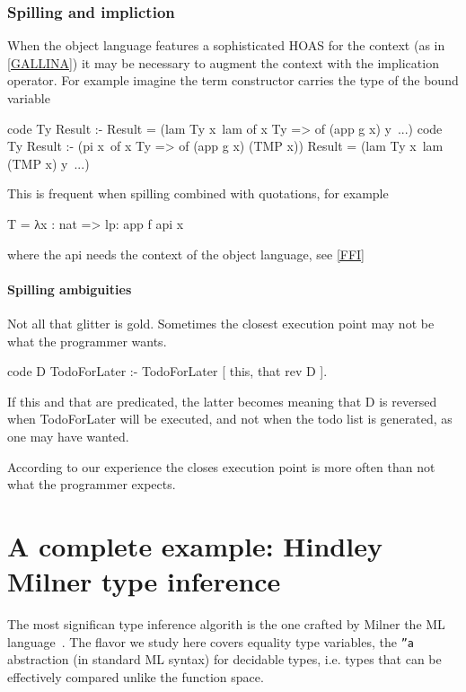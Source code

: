 \documentclass[a4paper, 11pt]{book}
\begin{document}
\subsubsection{Spilling and impliction}

When the object language features a sophisticated HOAS for the context
(as in \ref{GALLINA}) it may be necessary to augment the context with
the implication operator. For example imagine the 
term constructor carries the type of the bound variable

\begin{elpicode}
  code Ty Result :- Result = (lam Ty x\ lam {of x Ty => of (app g x)} y\ ...)
  code Ty Result :-
    (pi x\ of x Ty => of (app g x) (TMP x))
    Result = (lam Ty x\ lam (TMP x) y\ ...)
\end{elpicode}

This is frequent when spilling combined with quotations, for example

\begin{elpicode}
  T = {{ λx : nat => lp:{{ app f {api x}  }}  }}
\end{elpicode}

where the api needs the context of the object language, see \ref{FFI}

\paragraph{Spilling ambiguities}

Not all that glitter is gold. Sometimes the closest execution
point may not be what the programmer wants.

\begin{elpicode}
  code D TodoForLater  :-
    TodoForLater [ this, that {rev D} ].
\end{elpicode}

If this and that are predicated, the latter becomes
 meaning that
D is reversed when TodoForLater will be executed, and
not when the todo list is generated, as one may have wanted.

According to our experience the closes execution point
is more often than not what the programmer expects.

\section{A complete example: Hindley Milner type inference}\label{sec:milner}

The most significan type inference algorith is the one crafted by
Milner the ML language~\cite{MILNER1978348}. The flavor we 
study here covers equality type variables, the \texttt{''a} abstraction
(in standard ML syntax) for decidable types, i.e. types that can be
effectively compared unlike the function space.
\end{document}
